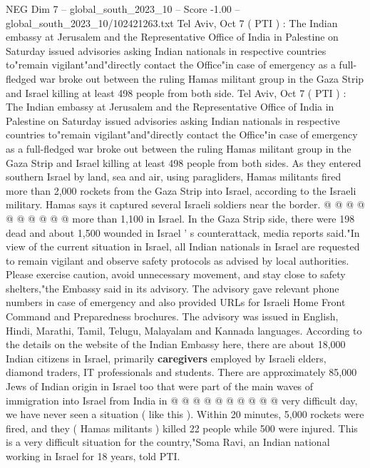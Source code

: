 \begin{textsample}{NEG Dim 7 – global\_south\_2023\_10 – Score -1.00 – global\_south\_2023\_10/102421263.txt}  \label{ex:f7_neg_068}
Tel Aviv, Oct 7 ( PTI ) : The Indian embassy at Jerusalem and the Representative Office of India in Palestine on Saturday issued advisories asking Indian nationals in respective countries to"remain vigilant"and"directly contact the Office"in case of emergency as a full-fledged war broke out between the ruling Hamas militant group in the Gaza Strip and Israel killing at least 498 people from both side.
Tel Aviv, Oct 7 ( PTI ) : The Indian embassy at Jerusalem and the Representative Office of India in Palestine on Saturday issued advisories asking Indian nationals in respective countries to"remain vigilant"and"directly contact the Office"in case of emergency as a full-fledged war broke out between the ruling Hamas militant group in the Gaza Strip and Israel killing at least 498 people from both sides.
As they entered southern Israel by land, sea and air, using paragliders, Hamas militants fired more than 2,000 rockets from the Gaza Strip into Israel, according to the Israeli military.
Hamas says it captured several Israeli soldiers near the border. @ @ @ @ @ @ @ @ @ @ more than 1,100 in Israel.
In the Gaza Strip side, there were 198 dead and about 1,500 wounded in Israel ' s counterattack, media reports said."In view of the current situation in Israel, all Indian nationals in Israel are requested to remain vigilant and observe safety protocols as advised by local authorities.
Please exercise caution, avoid unnecessary movement, and stay close to safety shelters,"the Embassy said in its advisory.
The advisory gave relevant phone numbers in case of emergency and also provided URLs for Israeli Home Front Command and Preparedness brochures.
The advisory was issued in English, Hindi, Marathi, Tamil, Telugu, Malayalam and Kannada languages.
According to the details on the website of the Indian Embassy here, there are about 18,000 Indian citizens in Israel, primarily \textbf{caregivers} employed by Israeli elders, diamond traders, IT professionals and students.
There are approximately 85,000 Jews of Indian origin in Israel too that were part of the main waves of immigration into Israel from India in @ @ @ @ @ @ @ @ @ @ very difficult day, we have never seen a situation ( like this ).
Within 20 minutes, 5,000 rockets were fired, and they ( Hamas militants ) killed 22 people while 500 were injured.
This is a very difficult situation for the country,"Soma Ravi, an Indian national working in Israel for 18 years, told PTI.

\end{textsample}
